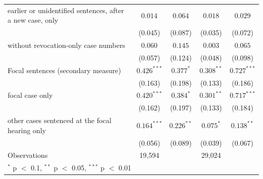 \begin{tabular}{lcccc}
\quad earlier or unidentified sentences, after a new case, only & $0.014$ & $0.064$ & $0.018$ & $0.029$ \\
 & (0.045) & (0.087) & (0.035) & (0.072) \\
\quad without revocation-only case numbers & $0.060$ & $0.145$ & $0.003$ & $0.065$ \\
 & (0.057) & (0.124) & (0.048) & (0.098) \\
Focal sentences (secondary measure) & $0.426^{***}$ & $0.377^{*}$ & $0.308^{**}$ & $0.727^{***}$ \\
 & (0.163) & (0.198) & (0.133) & (0.186) \\
\quad focal case only & $0.420^{***}$ & $0.384^{*}$ & $0.301^{**}$ & $0.717^{***}$ \\
 & (0.162) & (0.197) & (0.133) & (0.184) \\
\quad other cases sentenced at the focal hearing only & $0.164^{***}$ & $0.226^{**}$ & $0.075^{*}$ & $0.138^{**}$ \\
 & (0.056) & (0.089) & (0.039) & (0.067) \\
Observations & 19,594 &  & 29,024 &  \\
\bottomrule
\multicolumn{5}{l}{\footnotesize $^{*}$ p $<$ 0.1, $^{**}$ p $<$ 0.05, $^{***}$ p $<$ 0.01} \\
\end{tabular}
